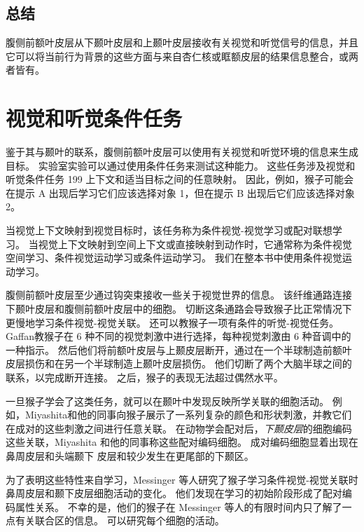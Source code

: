 \subsection{总结}
腹侧前额叶皮层从下颞叶皮层和上颞叶皮层接收有关视觉和听觉信号的信息，并且它可以将当前行为背景的这些方面与来自杏仁核或眶额皮层的结果信息整合\cite{barbas1989architecture}，或两者皆有。


\section{视觉和听觉条件任务}
\par
鉴于其与颞叶的联系，腹侧前额叶皮层可以使用有关视觉和听觉环境的信息来生成目标。 
实验室实验可以通过使用条件任务来测试这种能力。 
这些任务涉及视觉和听觉条件任务 199 上下文和适当目标之间的任意映射。
因此，例如，猴子可能会在提示 A 出现后学习它们应该选择对象 1，但在提示 B 出现后它们应该选择对象 2。
\par


当视觉上下文映射到视觉目标时，该任务称为条件视觉-视觉学习或配对联想学习。 
当视觉上下文映射到空间上下文或直接映射到动作时，它通常称为条件视觉空间学习、条件视觉运动学习或条件运动学习。
我们在整本书中使用条件视觉运动学习。
\par


腹侧前额叶皮层至少通过钩突束接收一些关于视觉世界的信息。 
该纤维通路连接下颞叶皮层和腹侧前额叶皮层中的细胞\cite{ungerleider1989projections}。 
切断这条通路会导致猴子比正常情况下更慢地学习条件视觉-视觉关联\cite{eacott1992inferotemporal,gutnikov1997temporo}。
还可以教猴子一项有条件的听觉-视觉任务。 
Gaffan\cite{gaffan1991auditory}教猴子在 6 种不同的视觉刺激中进行选择，每种视觉刺激由 6 种音调中的一种指示。 
然后他们将前额叶皮层与上颞皮层断开，通过在一个半球制造前额叶皮层损伤和在另一个半球制造上颞叶皮层损伤。 
他们切断了两个大脑半球之间的联系，以完成断开连接。 
之后，猴子的表现无法超过偶然水平。
\par


一旦猴子学会了这类任务，就可以在颞叶中发现反映所学关联的细胞活动。 
例如，Miyashita和他的同事向猴子展示了一系列复杂的颜色和形状刺激，并教它们在成对的这些刺激之间进行任意关联\cite{sakai1991neural,naya1996activity}。
在动物学会配对后，\textit{下颞皮层}的细胞编码这些关联，Miyashita 和他的同事称这些配对编码细胞。 
成对编码细胞显着出现在鼻周皮层和头端颞下
皮层和较少发生在更尾部的下颞区\cite{naya2001backward}。
\par


为了表明这些特性来自学习，Messinger 等人\cite{messinger2001neuronal}研究了猴子学习条件视觉-视觉关联时鼻周皮层和颞下皮层细胞活动的变化。 
他们发现在学习的初始阶段形成了配对编码属性关系。 
不幸的是，他们的猴子在 Messinger 等人的有限时间内只了解了一点有关联合区的信息。 
可以研究每个细胞的活动。
\par


